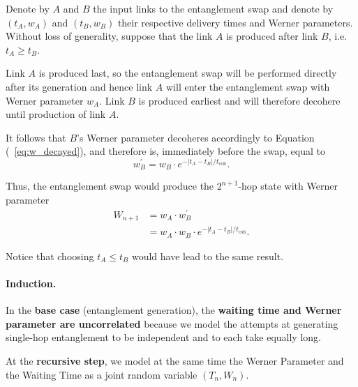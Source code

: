 \documentclass{masterthesis}
\begin{document}
Denote by $A$ and $B$ the input links to the entanglement swap and denote by $\left(t_{A}, w_{A}\right)$ and $\left(t_{B}, w_{B}\right)$ their respective delivery times and Werner parameters. 
Without loss of generality, suppose that the link $A$ is produced after link $B$, i.e.\ $t_{A} \geq t_{B}$. 

Link $A$ is produced last, so the entanglement swap will be performed directly after its generation and hence link $A$ will enter the entanglement swap with Werner parameter $w_{A}$. Link $B$ is produced earliest and will therefore decohere until production of link $A$.

It follows that $B$'s Werner parameter decoheres accordingly to Equation (~\ref{eq:w_decayed}), and therefore is, immediately before the swap, equal to
\begin{equation*}
    w_{B}^{\prime} = w_{B} \cdot e^{-\left|t_{A}-t_{B}\right| / t_\text{coh}} .
\end{equation*}

Thus, the entanglement swap would produce the $2^{n+1}$-hop state with Werner parameter
\begin{align}
W_{n+1} &= w_{A} \cdot w_{B}^{\prime} \nonumber \\
        &= w_{A} \cdot w_{B} \cdot e^{-\left|t_{A}-t_{B}\right| / t_\text{coh}} .
\end{align}

Notice that choosing $t_{A} \leq t_{B}$ would have lead to the same result.

\paragraph*{Induction.}

In the \textbf{base case} (entanglement generation), the \textbf{waiting time and Werner parameter are uncorrelated} because we model the attempts at generating single-hop entanglement to be independent and to each take equally long.

At the \textbf{recursive step}, we model at the same time the Werner Parameter and the Waiting Time as a joint random variable $(T_n, W_n)$.

\end{document}

